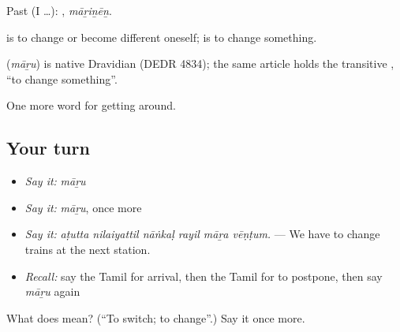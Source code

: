 Past (I …): , \emph{māṟiṉēṉ}.

 is to change or become different oneself;  is to change something.

\begin{cousinweb}
\textbf{} (\emph{māṟu}) is native Dravidian (DEDR 4834); the same article holds the transitive , \textquotedblleft{}to change something\textquotedblright{}.
\end{cousinweb}

\begin{grammarlens}[title={What you've built}]
One more word for getting around.
\end{grammarlens}

\subsection*{Your turn}
\begin{itemize}
\raggedright
  \item \emph{Say it:} \emph{māṟu}
  \item \emph{Say it:} \emph{māṟu}, once more
  \item \emph{Say it:} \emph{aṭutta nilaiyattil nāṅkaḷ rayil māṟa vēṇṭum.} — We have to change trains at the next station.
  \item \emph{Recall:} say the Tamil for arrival, then the Tamil for to postpone, then say \emph{māṟu} again
\end{itemize}

\begin{tcolorbox}[breakable,colback=teal!4,colframe=teal!35!black,title={Before you move on}]
What does  mean? (\textquotedblleft{}To switch; to change\textquotedblright{}.) Say it once more.
\end{tcolorbox}
